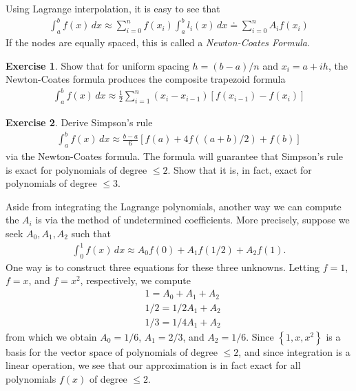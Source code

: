 \documentclass[12pt]{article}
\theoremstyle{plain}
\theoremstyle{definition}
\newtheorem*{exercise}{Exercise}
\theoremstyle{remark}
\numberwithin{equation}{section}  %
\begin{document}
		Using Lagrange interpolation, it is easy to see that
		\begin{align*}
			\int_a^b f(x)\, dx \approx \sum_{i=0}^n f(x_i)\int_a^b l_i(x)\, dx 
			\doteq \sum_{i=0}^n A_i f(x_i)
		\end{align*}
		If the nodes are equally spaced, this is called a \emph{Newton-Coates Formula}.
		\begin{exercise}
			Show that for uniform spacing $h = (b-a)/n$ and $x_i = a + ih$,
			the Newton-Coates formula produces the composite trapezoid formula
			\begin{align*}
				\int_a^b f(x) \, dx \approx \frac{1}{2}\sum_{i=1}^n
				(x_i - x_{i-1})[f(x_{i-1}) - f(x_i)]
			\end{align*}
		\end{exercise}
		\begin{exercise}
			Derive Simpson's rule
			\begin{align*}
				\int_a^b f(x)\, dx \approx \frac{b-a}{6} \left [f(a) + 4f((a+b)/2) + f(b) \right]	
			\end{align*}
			via the Newton-Coates formula. The formula will guarantee that
			Simpson's rule is exact for polynomials of degree $\le 2$. Show that it is,
			in fact, exact for polynomials of degree $\le 3$.
		\end{exercise}
		Aside from integrating the Lagrange polynomials, another way we can
		compute the $A_i$ is via the method of undetermined coefficients. More precisely,
		suppose we seek $A_0, A_1, A_2$ such that
		\begin{align*}
			\int_0^1 f(x) \, dx \approx A_0 f(0) + A_1 f(1/2) + A_2 f(1).
		\end{align*}
		One way is to construct three equations for these three unknowns.
		Letting $f = 1$, $f = x$, and $f = x^2$, respectively, we compute
		\begin{align*}
			& 1 = A_0 + A_1 + A_2
			\\
			& 1/2 = 1/2A_1 + A_2
			\\
			& 1/3 = 1/4A_1 + A_2
		\end{align*}
		from which we obtain $A_0 = 1/6$, $A_1 = 2/3$, and $A_2 = 1/6$.
		Since $ \left\{ 1, x, x^2 \right\} $ is a basis for the vector space of 
		polynomials of degree $\le 2$, and since integration is a linear operation, we see that our approximation is in fact exact
		for all polynomials $f(x)$ of degree $\le 2$.
\end{document}
